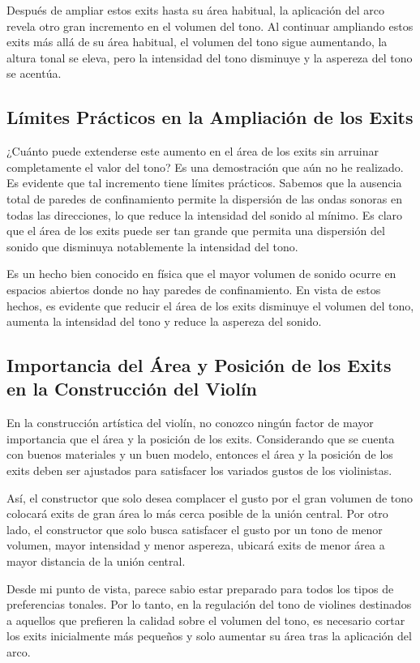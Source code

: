 \documentclass[12pt]{book}
\begin{document}
Después de ampliar estos exits hasta su área habitual, la aplicación del arco revela otro gran incremento en el volumen del tono. Al continuar ampliando estos exits más allá de su área habitual, el volumen del tono sigue aumentando, la altura tonal se eleva, pero la intensidad del tono disminuye y la aspereza del tono se acentúa.

\subsection*{Límites Prácticos en la Ampliación de los Exits}

¿Cuánto puede extenderse este aumento en el área de los exits sin arruinar completamente el valor del tono? Es una demostración que aún no he realizado. Es evidente que tal incremento tiene límites prácticos. Sabemos que la ausencia total de paredes de confinamiento permite la dispersión de las ondas sonoras en todas las direcciones, lo que reduce la intensidad del sonido al mínimo. Es claro que el área de los exits puede ser tan grande que permita una dispersión del sonido que disminuya notablemente la intensidad del tono.

Es un hecho bien conocido en física que el mayor volumen de sonido ocurre en espacios abiertos donde no hay paredes de confinamiento. En vista de estos hechos, es evidente que reducir el área de los exits disminuye el volumen del tono, aumenta la intensidad del tono y reduce la aspereza del sonido.

\subsection*{Importancia del Área y Posición de los Exits en la Construcción del Violín}

En la construcción artística del violín, no conozco ningún factor de mayor importancia que el área y la posición de los exits. Considerando que se cuenta con buenos materiales y un buen modelo, entonces el área y la posición de los exits deben ser ajustados para satisfacer los variados gustos de los violinistas.

Así, el constructor que solo desea complacer el gusto por el gran volumen de tono colocará exits de gran área lo más cerca posible de la unión central. Por otro lado, el constructor que solo busca satisfacer el gusto por un tono de menor volumen, mayor intensidad y menor aspereza, ubicará exits de menor área a mayor distancia de la unión central.

Desde mi punto de vista, parece sabio estar preparado para todos los tipos de preferencias tonales. Por lo tanto, en la regulación del tono de violines destinados a aquellos que prefieren la calidad sobre el volumen del tono, es necesario cortar los exits inicialmente más pequeños y solo aumentar su área tras la aplicación del arco. 
\end{document}
